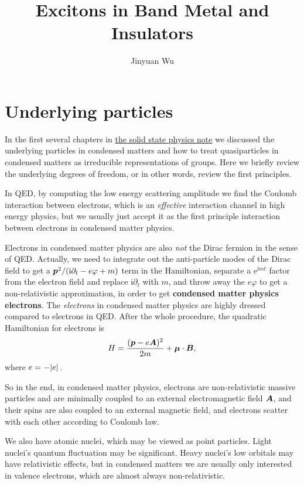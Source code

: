 \documentclass[hyperref, a4paper]{article}
\title{Excitons in Band Metal and Insulators}
\author{Jinyuan Wu}
\newcommand*{\ii}{\mathrm{i}}
\newcommand*{\ee}{\mathrm{e}}
\newcommand*{\concept}[1]{{\textbf{#1}}}
\begin{document}
\maketitle

\section{Underlying particles}

In the first several chapters in \href{../solid/solid.pdf}{the solid state physics note} we discussed 
the underlying particles in condensed matters and how to treat quasiparticles in condensed matters 
as irreducible representations of groups. Here we briefly review the underlying degrees of freedom,
or in other words, review the first principles.

In QED, by computing the low energy scattering amplitude we find the Coulomb interaction 
between electrons, which is an \emph{effective} interaction channel in high energy physics, but we 
usually just accept it as the first principle interaction between electrons in condensed matter physics. 

Electrons in condensed matter physics are also \emph{not} the Dirac fermion in the sense of QED. 
Actually, we need to integrate out the anti-particle modes of the Dirac field to get 
a $\vb*{p}^2 / (\ii \partial_t - e \varphi + m)$ term in the Hamiltonian, separate a $\ee^{\ii m t}$
factor from the electron field and replace $\ii \partial_t$ with $m$, and throw away the $e \varphi$  
to get a non-relativistic approximation, in order to get \concept{condensed matter physics electrons}.
The \emph{electrons} in condensed matter physics are highly dressed compared to electrons in QED.
After the whole procedure, the quadratic Hamiltonian for electrons is 
\begin{equation}
    H = \frac{(\vb*{p} - e \vb*{A})^2}{2m} + \vb*{\mu} \cdot \vb*{B},
\end{equation}
where $e = - \abs*{e}$.

So in the end, in condensed matter physics, electrons are non-relativistic massive particles and are 
minimally coupled to an external electromagnetic field $\vb*{A}$, and their spins are also coupled 
to an external magnetic field, and electrons scatter with each other according to Coulomb law.

We also have atomic nuclei, which may be viewed as point particles. Light nuclei's quantum fluctuation
may be significant. Heavy nuclei's low orbitals may have relativistic effects, but in condensed matters 
we are usually only interested in valence electrons, which are almost always non-relativistic.
\end{document}
